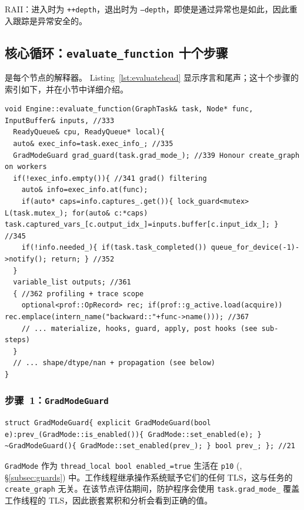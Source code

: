 RAII：进入时为 \texttt{++depth}，退出时为 \texttt{--depth}，即使是通过异常也是如此，因此重入跟踪是异常安全的。

\subsection{核心循环：\texttt{evaluate\_function} 十个步骤}
\label{subsec:evaluate}

是每个节点的解释器。 Listing~\ref{lst:evaluatehead} 显示序言和尾声；这十个步骤的索引如下，并在小节中详细介绍。

\begin{lstlisting}[caption={prologue.}, label=lst:evaluatehead]
void Engine::evaluate_function(GraphTask& task, Node* func, InputBuffer& inputs, //333
  ReadyQueue& cpu, ReadyQueue* local){
  auto& exec_info=task.exec_info_; //335
  GradModeGuard grad_guard(task.grad_mode_); //339 Honour create_graph on workers
  if(!exec_info.empty()){ //341 grad() filtering
    auto& info=exec_info.at(func);
    if(auto* caps=info.captures_.get()){ lock_guard<mutex> L(task.mutex_); for(auto& c:*caps) task.captured_vars_[c.output_idx_]=inputs.buffer[c.input_idx_]; } //345
    if(!info.needed_){ if(task.task_completed()) queue_for_device(-1)->notify(); return; } //352
  }
  variable_list outputs; //361
  { //362 profiling + trace scope
    optional<prof::OpRecord> rec; if(prof::g_active.load(acquire)) rec.emplace(intern_name("backward::"+func->name())); //367
    // ... materialize, hooks, guard, apply, post hooks (see sub-steps)
  }
  // ... shape/dtype/nan + propagation (see below)
}
\end{lstlisting}

\subsubsection{步骤~1：\texttt{GradModeGuard}}
\label{subsubsec:gradguard}

\begin{lstlisting}[caption={honour \texttt{create\_graph} on workers.}, label=lst:gradguard]
struct GradModeGuard{ explicit GradModeGuard(bool e):prev_(GradMode::is_enabled()){ GradMode::set_enabled(e); } ~GradModeGuard(){ GradMode::set_enabled(prev_); } bool prev_; }; //21
\end{lstlisting}

\texttt{GradMode} 作为 \texttt{thread\_local bool enabled\_=true} 生活在 \texttt{p10} (, \S\ref{subsec:guards}) 中。工作线程继承操作系统赋予它们的任何 TLS，这与任务的 \texttt{create\_graph} 无关。在该节点评估期间，防护程序会使用 \texttt{task.grad\_mode\_} 覆盖工作线程的 TLS，因此嵌套累积和分析会看到正确的值。

